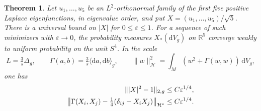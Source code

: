 \documentclass[11pt]{article}
\numberwithin{equation}{section}
\newtheorem{theorem}{Theorem}[section]
\newcommand{\dd}{\mathrm{d}}
\newcommand{\e}{\varepsilon}
\newcommand{\RR}{\mathbb{R}}
\newcommand{\ip}[2]{\langle #1,#2\rangle}
\newcommand{\abs}[1]{\lvert #1\rvert}
\newcommand{\norm}[1]{\lVert #1\rVert}
\newcommand{\dv}{\dd V_g}
\begin{document}
\begin{theorem}\label{thm:near}
Let \(u_1,\ldots,u_5\) be an \(L^2\)-orthonormal family of the first
five positive Laplace eigenfunctions, in eigenvalue order,
and put \(X=(u_1,\ldots,u_5)/\sqrt5\).
There is a universal bound on \(\abs X\) for \(0\le\e\le1\).
For a sequence of such minimizers with \(\e\to0\),
the probability measures \(X_*(\dd V_g)\) on \(\RR^5\) converge
weakly to uniform probability on the unit \(S^4\).
In the scale
\[
 L=\tfrac3s\Delta_g,\qquad
 \Gamma(a,b)=\tfrac3s\ip{\dd a}{\dd b}_g,\qquad
 \norm{w}_{\mathcal H}^2=\int_M(w^2+\Gamma(w,w))\,\dv ,
\]
one has
\begin{align}
 \norm{\abs X^2-1}_{2,g}&\le C\e^{1/4},\notag\\
 \left\|\Gamma(X_i,X_j)-\tfrac14(\delta_{ij}-X_iX_j)\right\|_{\mathcal H^*}
 &\le C\e^{1/4}.
 \label{eq:near-gram}
\end{align}
\end{theorem}
\end{document}
